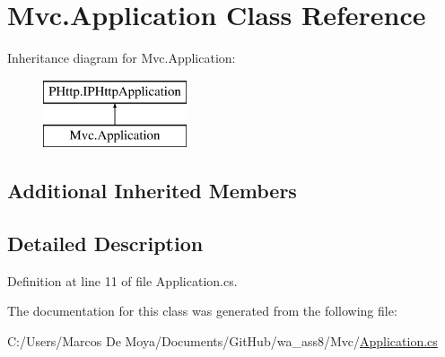 \hypertarget{class_mvc_1_1_application}{}\section{Mvc.\+Application Class Reference}
\label{class_mvc_1_1_application}
Inheritance diagram for Mvc.\+Application\+:\begin{figure}[H]
\begin{center}
\leavevmode
\includegraphics[height=2.000000cm]{class_mvc_1_1_application}
\end{center}
\end{figure}
\subsection*{Additional Inherited Members}


\subsection{Detailed Description}


Definition at line 11 of file Application.\+cs.



The documentation for this class was generated from the following file\+:\begin{DoxyCompactItemize}
\item 
C\+:/\+Users/\+Marcos De Moya/\+Documents/\+Git\+Hub/wa\+\_\+ass8/\+Mvc/\hyperlink{_mvc_2_application_8cs}{Application.\+cs}\end{DoxyCompactItemize}
